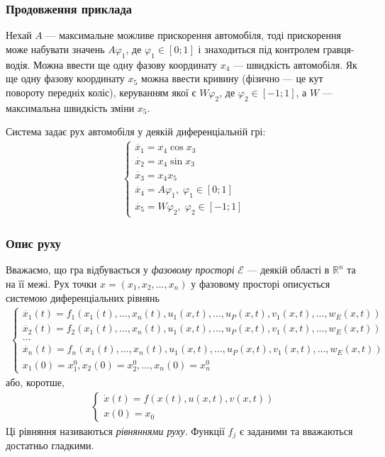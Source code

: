 \documentclass[10pt,pdf,aspectratio=169]{beamer}
\newcommand{\R}{\mathbb{R}}
\newcommand{\vf}{\varphi}
\renewcommand{\d}[1]{\dot{#1}}
\newcommand{\E}{\mathcal{E}}
\renewcommand{\l}{\left}
\renewcommand{\r}{\right}
\begin{document}
    \begin{frame}
        \frametitle{Продовження приклада}

        Нехай $A$ --- максимальне можливе прискорення автомобіля, тоді прискорення може набувати значень
        $A \vf_1$, де $\vf_1 \in [0; 1]$ і знаходиться під контролем гравця-водія. Можна ввести ще одну фазову координату $x_4$ --- швидкість автомобіля.
        Як ще одну фазову координату $x_5$ можна ввести кривину
        (фізично --- це кут повороту передніх коліс), керуванням якої є $W \vf_2$, де $\vf_2 \in [-1; 1]$, а $W$ --- максимальна швидкість зміни $x_5$.

        Система задає рух автомобіля у деякій диференціальній грі:
        \begin{gather*}
            \begin{cases}
                \d{x_1} = x_4 \cos{x_3} \\
                \d{x_2} = x_4 \sin{x_3} \\
                \d{x_3} = x_4 x_5 \\
                \d{x_4} = A \vf_1, \; \vf_1 \in [0; 1] \\
                \d{x_5} = W \vf_2, \; \vf_2 \in [-1; 1]
            \end{cases}
        \end{gather*}
    \end{frame}
    \begin{frame}
        \frametitle{Опис руху}
    
        Вважаємо, що гра відбувається у \emph{фазовому просторі} $\E$ --- деякій області в $\R^n$ та на її межі.
        Рух точки $x = \l(x_1, x_2, ..., x_n \r)$ у фазовому просторі описується системою диференціальних рівнянь
        \begin{gather*}\label{eq_1}
            \begin{cases}
                \d{x_1}(t) = f_1(x_1(t), ..., x_n(t), u_1(x, t), ..., u_P(x, t), v_1(x, t), ..., w_E(x, t)) \\
                \d{x_2}(t) = f_2(x_1(t), ..., x_n(t), u_1(x, t), ..., u_P(x, t), v_1(x, t), ..., w_E(x, t)) \\
                \dots \\
                \d{x_n}(t) = f_n(x_1(t), ..., x_n(t), u_1(x, t), ..., u_P(x, t), v_1(x, t), ..., w_E(x, t)) \\
                x_1(0) = x_1^0, x_2(0) = x_2^0, ..., x_n(0) = x_n^0
            \end{cases}
        \end{gather*}
        або, коротше,
        \begin{gather*}\label{eq_2}
            \begin{cases}
                \d{x}(t) = {f}(x(t), u(x, t), v(x, t)) \\
                x(0) = x_0
            \end{cases}
        \end{gather*}
        Ці рівняння називаються \emph{рівняннями руху}. Функції $f_j$ є заданими та вважаються достатньо гладкими.
    \end{frame}
\end{document}
